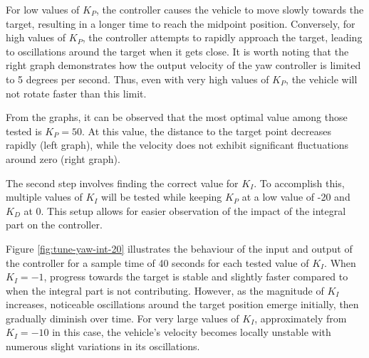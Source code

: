 For low values of $K_{P}$, the controller causes the vehicle to move slowly towards the target, resulting in a longer time to reach the midpoint position. Conversely, for high values of $K_{P}$, the controller attempts to rapidly approach the target, leading to oscillations around the target when it gets close. It is worth noting that the right graph demonstrates how the output velocity of the yaw controller is limited to 5 degrees per second. Thus, even with very high values of $K_{P}$, the vehicle will not rotate faster than this limit.

From the graphs, it can be observed that the most optimal value among those tested is $K_{P}=50$. At this value, the distance to the target point decreases rapidly (left graph), while the velocity does not exhibit significant fluctuations around zero (right graph).

The second step involves finding the correct value for $K_{I}$. To accomplish this, multiple values of $K_{I}$ will be tested while keeping $K_{P}$ at a low value of -20 and $K_{D}$ at 0. This setup allows for easier observation of the impact of the integral part on the controller.

Figure \ref{fig:tune-yaw-int-20} illustrates the behaviour of the input and output of the controller for a sample time of 40 seconds for each tested value of $K_{I}$. When $K_{I}=-1$, progress towards the target is stable and slightly faster compared to when the integral part is not contributing. However, as the magnitude of $K_{I}$ increases, noticeable oscillations around the target position emerge initially, then gradually diminish over time. For very large values of $K_{I}$, approximately from $K_{I}=-10$ in this case, the vehicle's velocity becomes locally unstable with numerous slight variations in its oscillations.

